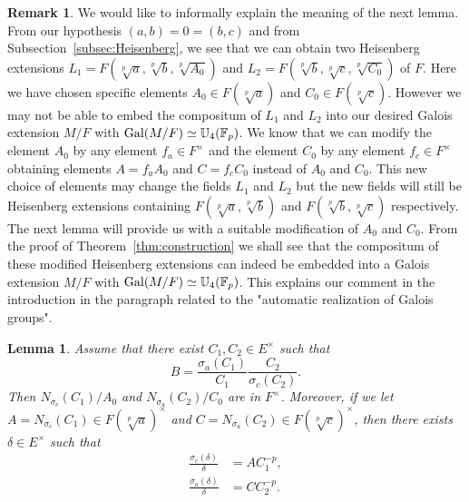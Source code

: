 \documentclass[12pt,leqno]{amsart}
\theoremstyle{plain}
\newtheorem{lem}[thm]{Lemma}
\theoremstyle{definition}
\newtheorem{rmk}[thm]{Remark}
\newcommand{\Gal}{{\rm Gal}}
\newcommand{\F}{{\mathbb F}}
\newcommand{\U}{{\mathbb U}}
\begin{document}
\begin{rmk}
\label{rmk:modification}
 We would like to  informally explain the meaning of the next lemma. 
  From our hypothesis $(a,b)=0=(b,c)$ and from Subsection~\ref{subsec:Heisenberg}, we see that we can obtain two Heisenberg extensions $L_1=F(\sqrt[p]{a},\sqrt[p]{b},\sqrt[p]{A_0})$ and $L_2=F(\sqrt[p]{b},\sqrt[p]{c},\sqrt[p]{C_0})$ of $F$. Here we have chosen specific elements $A_0\in F(\sqrt[p]{a})$ and $C_0\in F(\sqrt[p]{c})$. However we may  not be able to embed  the compositum of $L_1$ and $L_2$ into our desired Galois extension $M/F$ with $\Gal(M/F)\simeq \U_4(\F_p)$. 
  We know that we can modify the element $A_0$ by any element $f_a\in F^\times$ and the element $C_0$ by any element $f_c\in F^\times$ obtaining elements $A=f_aA_0$ and $C=f_cC_0$ instead of $A_0$ and $C_0$. This new choice of elements may change the fields $L_1$ and $L_2$ but the new fields will  still be Heisenberg extensions containing $F(\sqrt[p]{a},\sqrt[p]{b})$ and $F(\sqrt[p]{b},\sqrt[p]{c})$ respectively.
The next lemma will provide us with a suitable  modification of $A_0$ and $C_0$. From the proof of Theorem~\ref{thm:construction} we shall see that the compositum of these modified Heisenberg extensions can indeed be embedded into a Galois extension $M/F$ with $\Gal(M/F)\simeq \U_4(\F_p)$. This explains our comment in the introduction in the paragraph related to the "automatic realization of Galois groups".
\end{rmk}

\begin{lem}
\label{lem:modification}
Assume that there exist $C_1, C_2\in E^\times$ such that 
\[ B=\frac{\sigma_a(C_1)}{C_1} \frac{C_2}{\sigma_c(C_2)}.\]
Then $N_{\sigma_c}(C_1)/A_0$ and $N_{\sigma_a}(C_2)/C_0$ are in $F^\times$. Moreover, if we let $A=N_{\sigma_c}(C_1)\in F(\sqrt[p]{a})^\times$ and $C=N_{\sigma_a}(C_2)\in F(\sqrt[p]{c})^\times$, then  there exists 
 $\delta \in E^\times$ such that
\[
\begin{aligned}
\frac{\sigma_c(\delta)}{\delta}&= A C_1^{-p},\\
\frac{\sigma_a(\delta)}{\delta}&=C C_2^{-p}.
\end{aligned}
\]
\end{lem}
\end{document}
